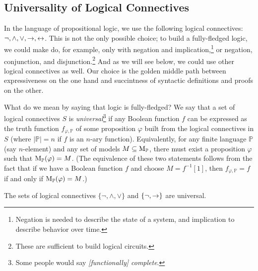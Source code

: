 \subsection{Universality of Logical Connectives}

In the language of propositional logic, we use the following logical connectives: $\neg, \land, \lor, \mathbin{\rightarrow}, \mathbin{\leftrightarrow}$. This is not the only possible choice; to build a fully-fledged logic, we could make do, for example, only with negation and implication,\footnote{Negation is needed to describe the state of a system, and implication to describe behavior over time.} or negation, conjunction, and disjunction.\footnote{These are sufficient to build logical circuits.} And as we will see below, we could use other logical connectives as well. Our choice is the golden middle path between expressiveness on the one hand and succintness of syntactic definitions and proofs on the other.

What do we mean by saying that logic is fully-fledged? We say that a set of logical connectives $S$ is \emph{universal}\footnote{Some people would say \emph{[functionally] complete}.} if any Boolean function $f$ can be expressed as the truth function $f_{\varphi,\mathbb{P}}$ of some proposition $\varphi$ built from the logical connectives in $S$ (where $|\mathbb{P}|=n$ if $f$ is an $n$-ary function). Equivalently, for any finite language $\mathbb{P}$ (say $n$-element) and any set of models $M \subseteq \operatorname{M}_\mathbb{P}$, there must exist a proposition $\varphi$ such that $\operatorname{M}_\mathbb{P}(\varphi) = M$. (The equivalence of these two statements follows from the fact that if we have a Boolean function $f$ and choose $M = f^{-1}[1]$, then $f_{\varphi,\mathbb{P}} = f$ if and only if $\operatorname{M}_\mathbb{P}(\varphi) = M$.)

\begin{proposition} \label{proposition:not-and-or-is-universal}
    The sets of logical connectives $\{\neg, \land, \lor\}$ and $\{\neg, \mathbin{\rightarrow}\}$ are universal.
\end{proposition}

